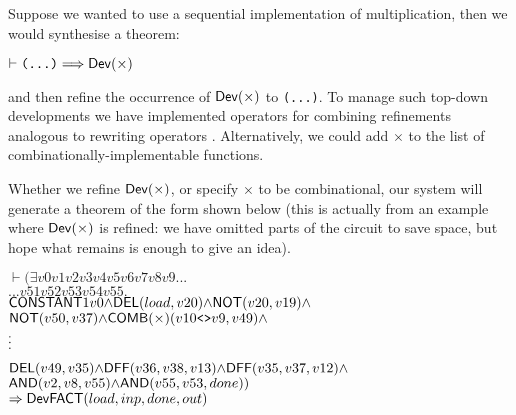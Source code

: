 \documentclass{llncs}
\begin{document}
Suppose we wanted to use a sequential implementation of multiplication,
then we would synthesise a theorem:

\vspace*{-2mm}

{\baselineskip10pt\begin{alltt}
\( \vdash \texttt{(...)} \Longrightarrow \DEF{Dev}({\times}) \)
\end{alltt}}

\vspace*{-3mm}

\noindent and then refine the occurrence of $\mathsf{Dev}(\times)$
to \texttt{(...)}. To manage such top-down developments we have
implemented operators for combining refinements analogous to rewriting
operators \cite{paulson83}.
Alternatively, we could add
${\times}$ to the list of combinationally-implementable functions.

Whether we refine $\mathsf{Dev}(\times)$, or specify $\times$ to be
combinational, our system will generate a theorem of the form shown
below (this is actually from an example where $\mathsf{Dev}(\times)$ is
refined: we have omitted parts of the circuit to save space, but hope
what remains is enough to give an idea).

\vspace*{-2mm}

{\baselineskip10pt\begin{alltt}
\( \vdash ({\exists}v0 v1 v2 v3 v4 v5 v6 v7 v8 v9 ...                                             \)
\(      ... v51 v52 v53 v54 v55.                                                                       \)
\(     \DEF{CONSTANT} 1 v0 {\wedge} \DEF{DEL}(load,v20) {\wedge} \DEF{NOT}(v20,v19) {\wedge}       \)
\(     \DEF{NOT}(v50,v37) {\wedge} \DEF{COMB}({\times})(v10\texttt{<>}v9,v49) {\wedge}                     \)
      \(\raisebox{3mm}{\vdots}\)
\(     \DEF{DEL}(v49,v35) {\wedge} \DEF{DFF}(v36,v38,v13) {\wedge} \DEF{DFF}(v35,v37,v12) {\wedge} \)
\(     \DEF{AND}(v2,v8,v55) {\wedge} \DEF{AND}(v55,v53,done))                                     \)
\(    \Rightarrow \DEF{Dev} \DEF{FACT} (load,inp,done,out)                                         \)
\end{alltt}}

\vspace*{-2mm}
\end{document}
